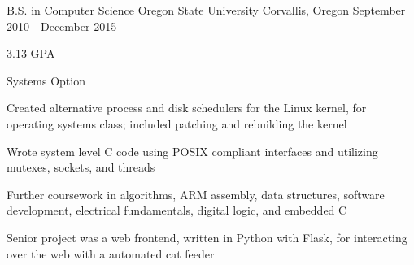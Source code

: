 

\begin{cventries}

  \cventry
    {B.S. in Computer Science} %
    {Oregon State University} %
    {Corvallis, Oregon} %
    {September 2010 - December 2015} %
    {
      \begin{cvitems} %
        \item {3.13 GPA}
        \item {Systems Option}
        \item {Created alternative process and disk schedulers for the Linux kernel, for operating systems class; included patching and rebuilding the kernel}
        \item {Wrote system level C code using POSIX compliant interfaces and utilizing mutexes, sockets, and threads}
        \item {Further coursework in algorithms, ARM assembly, data structures, software development, electrical fundamentals, digital logic, and embedded C}
        \item {Senior project was a web frontend, written in Python with Flask, for interacting over the web with a automated cat feeder}
      \end{cvitems}
    }

\end{cventries}
